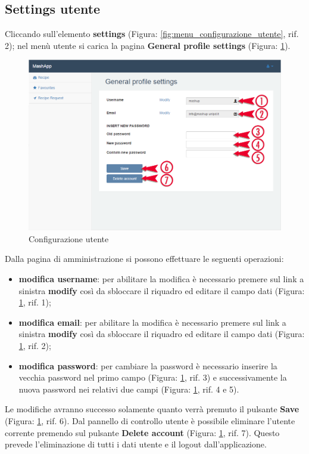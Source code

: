 	\subsection{Settings utente} %
	\label{sec:settings_utente}
		Cliccando sull'elemento \textbf{settings} (Figura: \ref{fig:menu_configurazione_utente}, rif. 2); nel menù utente si carica la pagina \textbf{General profile settings} (Figura: \ref{fig:configurazione_utente}).
		\begin{figure}[H]
			\centering
			\centerline{\includegraphics[width=14cm]{images/configurazione_utente.png}}
			\caption{Configurazione utente}
			\label{fig:configurazione_utente}
		\end{figure}
		Dalla pagina di amministrazione si possono effettuare le seguenti operazioni:
		\begin{itemize}
			\item \textbf{modifica username}: per abilitare la modifica è necessario premere sul link a sinistra \textbf{modify} così da sbloccare il riquadro ed editare il campo dati (Figura: \ref{fig:configurazione_utente}, rif. 1);
			\item \textbf{modifica email}: per abilitare la modifica è necessario premere sul link a sinistra \textbf{modify} così da sbloccare il riquadro ed editare il campo dati (Figura: \ref{fig:configurazione_utente}, rif. 2);
			\item \textbf{modifica password}: per cambiare la password è necessario inserire la vecchia password nel primo campo (Figura: \ref{fig:configurazione_utente}, rif. 3) e successivamente la nuova password nei relativi due campi (Figura: \ref{fig:configurazione_utente}, rif. 4 e 5).
		\end{itemize}
		Le modifiche avranno successo solamente quanto verrà premuto il pulsante \textbf{Save} (Figura: \ref{fig:configurazione_utente}, rif. 6).\newline
		Dal pannello di controllo utente è possibile eliminare l'utente corrente premendo sul pulsante \textbf{Delete account} (Figura: \ref{fig:configurazione_utente}, rif. 7). Questo prevede l'eliminazione di tutti i dati utente e il logout dall'applicazione.


